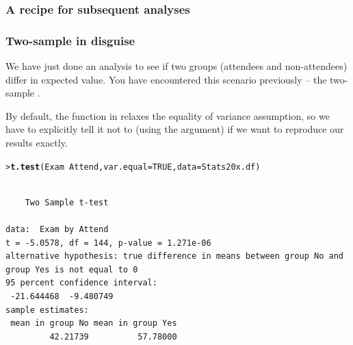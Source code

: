 \documentclass{beamer}\usepackage[]{graphicx}\usepackage[]{xcolor}
\makeatletter
\newcommand{\hlnum}[1]{\textcolor[rgb]{0.686,0.059,0.569}{#1}}%
\newcommand{\hlopt}[1]{\textcolor[rgb]{0,0,0}{#1}}%
\newcommand{\hlstd}[1]{\textcolor[rgb]{0.345,0.345,0.345}{#1}}%
\newcommand{\hlkwc}[1]{\textcolor[rgb]{0.333,0.667,0.333}{#1}}%
\newcommand{\hlkwd}[1]{\textcolor[rgb]{0.737,0.353,0.396}{\textbf{#1}}}%
\newenvironment{kframe}{%
 \def\at@end@of@kframe{}%
 \ifinner\ifhmode%
  \def\at@end@of@kframe{\end{minipage}}%
  \begin{minipage}{\columnwidth}%
 \fi\fi%
 \def\FrameCommand##1{\hskip\@totalleftmargin \hskip-\fboxsep
 \colorbox{shadecolor}{##1}\hskip-\fboxsep
     \hskip-\linewidth \hskip-\@totalleftmargin \hskip\columnwidth}%
 \MakeFramed {\advance\hsize-\width
   \@totalleftmargin\z@ \linewidth\hsize
   \@setminipage}}%
 {\par\unskip\endMakeFramed%
 \at@end@of@kframe}
\newenvironment{knitrout}{}{} %
\makeatother
\begin{document}
\begin{frame}[fragile]
\frametitle{A recipe for subsequent analyses}
\frametitle{Two-sample \ttest{} in disguise}

We have just done an analysis to see if two groups (attendees and non-attendees) differ
in expected value.
You have encountered this scenario previously -- the two-sample \ttest{}.

\medskip

By default, the  function in  relaxes the equality of variance assumption,
so we have to explicitly tell it not to (using the  argument) 
if we want to reproduce our  results exactly.

\begin{knitrout}\scriptsize
{}\color{fgcolor}\begin{kframe}
\begin{alltt}
\hlstd{> }\hlkwd{t.test}\hlstd{(Exam}\hlopt{~} \hlstd{Attend,} \hlkwc{var.equal}\hlstd{=}\hlnum{TRUE}\hlstd{,} \hlkwc{data} \hlstd{= Stats20x.df)}
\end{alltt}
\begin{verbatim}

	Two Sample t-test

data:  Exam by Attend
t = -5.0578, df = 144, p-value = 1.271e-06
alternative hypothesis: true difference in means between group No and group Yes is not equal to 0
95 percent confidence interval:
 -21.644468  -9.480749
sample estimates:
 mean in group No mean in group Yes 
         42.21739          57.78000 
\end{verbatim}
\end{kframe}
\end{knitrout}
\end{frame}
\end{document}
